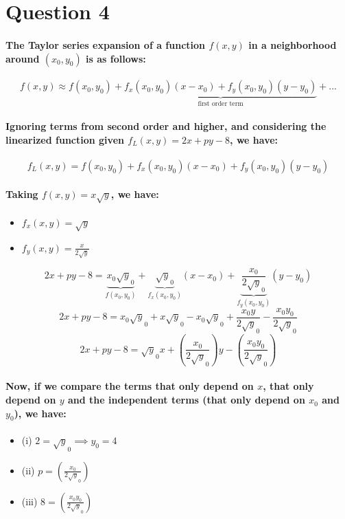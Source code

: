 \documentclass[a4paper]{article}    %
\begin{document}
\section*{Question 4}

\paragraph{The Taylor series expansion of a function $f(x,y)$ in a neighborhood around $(x_0,y_0)$ is as follows:}
    \[f(x,y) \approx f(x_0,y_0) + \underbrace{f_x(x_0,y_0)(x-x_0)+f_y(x_0,y_0)(y-y_0)}_{\text{first order term}} + ...\]

\paragraph{Ignoring terms from second order and higher, and considering the linearized function given $f_L(x,y)=2x+py-8$, we have:}
    \[f_L(x,y) = f(x_0,y_0) + f_x(x_0,y_0)(x-x_0)+f_y(x_0,y_0)(y-y_0)\]

\paragraph{Taking $f(x,y) = x\sqrt y$, we have:}
\begin{itemize}
    \item $f_x(x,y) = \sqrt y$
    \item $f_y(x,y) = \frac{x}{2\sqrt y}$
\end{itemize}
    \[2x+py-8 = \underbrace{x_0\sqrt y_0}_{f(x_0,y_0)} + \underbrace{\sqrt y_0}_{f_x(x_0,y_0)}(x-x_0) + \underbrace{\frac{x_0}{2\sqrt y_0}}_{f_y(x_0,y_0)}(y-y_0)\]
    \[2x+py-8 = x_0\sqrt y_0 + x\sqrt y_0 - x_0\sqrt y_0 + \frac{x_0 y}{2\sqrt y_0} - \frac{x_0 y_0}{2\sqrt y_0}\]
    \[2x+py-8 =  \sqrt y_0 x + \left(\frac{x_0}{2\sqrt y_0}\right) y - \left(\frac{x_0 y_0}{2\sqrt y_0}\right)\]
    
    \paragraph{Now, if we compare the terms that only depend on $x$, that only depend on $y$ and the independent terms (that only depend on $x_0$ and $y_0$), we have:}
\begin{itemize}
    \item (i)   $ 2 = \sqrt y_0 \implies \boxed{y_0 = 4}$ 
    \item (ii)  $ p = \left(\frac{x_0}{2\sqrt y_0}\right) $
    \item (iii) $ 8 = \left(\frac{x_0 y_0}{2\sqrt y_0}\right) $
\end{itemize}
\end{document}
